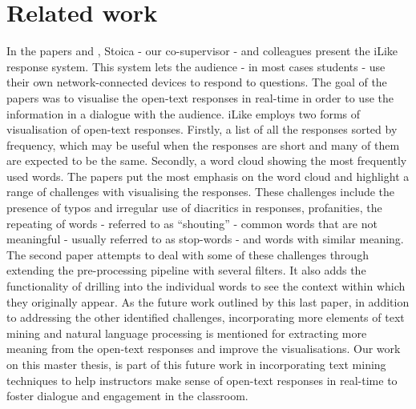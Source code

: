 \chapter{Related work}\label{chap:relatedwork}

\begin{comment}
    1. What we base our work upon ✅
    2. Use of response systems ✅
    3. Sentiment analysis ✅
    4. Topic modelling + sentiment analysis ✅
    5. SETSUM -> More comprehensive ✅
    6. Assessment and feedback through LLM ✅
\end{comment}

In the papers \cite{stoica2016} and \cite{stoica2017}, Stoica - our co-supervisor - and colleagues present the iLike response system. This system lets the audience - in most cases students - use their own network-connected devices to respond to questions. The goal of the papers was to visualise the open-text responses in real-time in order to use the information in a dialogue with the audience. iLike employs two forms of visualisation of open-text responses. Firstly, a list of all the responses sorted by frequency, which may be useful when the responses are short and many of them are expected to be the same. Secondly, a word cloud showing the most frequently used words. The papers put the most emphasis on the word cloud and highlight a range of challenges with visualising the responses. These challenges include the presence of typos and irregular use of diacritics in responses, profanities, the repeating of words - referred to as ``shouting'' - common words that are not meaningful - usually referred to as stop-words - and words with similar meaning. The second paper \cite{stoica2017} attempts to deal with some of these challenges through extending the pre-processing pipeline with several filters. It also adds the functionality of drilling into the individual words to see the context within which they originally appear. As the future work outlined by this last paper, in addition to addressing the other identified challenges, incorporating more elements of text mining and natural language processing is mentioned for extracting more meaning from the open-text responses and improve the visualisations. Our work on this master thesis, is part of this future work in incorporating text mining techniques to help instructors make sense of open-text responses in real-time to foster dialogue and engagement in the classroom.

